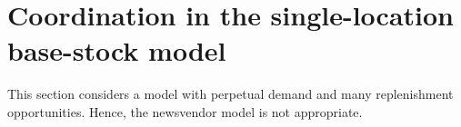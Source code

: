 \section{Coordination in the single-location base-stock model}
This section considers a model with perpetual demand and many replenishment opportunities. Hence, the newsvendor model is not appropriate. 